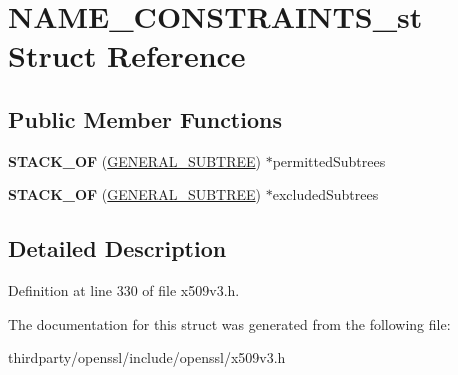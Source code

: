 \hypertarget{struct_n_a_m_e___c_o_n_s_t_r_a_i_n_t_s__st}{}\section{N\+A\+M\+E\+\_\+\+C\+O\+N\+S\+T\+R\+A\+I\+N\+T\+S\+\_\+st Struct Reference}
\label{struct_n_a_m_e___c_o_n_s_t_r_a_i_n_t_s__st}
\subsection*{Public Member Functions}
\begin{DoxyCompactItemize}
\item 
\mbox{\label{struct_n_a_m_e___c_o_n_s_t_r_a_i_n_t_s__st_a018745d61a5d6f8feedf7b6e693cce83}} 
{\bfseries S\+T\+A\+C\+K\+\_\+\+OF} (\hyperlink{struct_g_e_n_e_r_a_l___s_u_b_t_r_e_e__st}{G\+E\+N\+E\+R\+A\+L\+\_\+\+S\+U\+B\+T\+R\+EE}) $\ast$permitted\+Subtrees
\item 
\mbox{\label{struct_n_a_m_e___c_o_n_s_t_r_a_i_n_t_s__st_a92b0238c5c37f7d919e2fb9d23dd44c2}} 
{\bfseries S\+T\+A\+C\+K\+\_\+\+OF} (\hyperlink{struct_g_e_n_e_r_a_l___s_u_b_t_r_e_e__st}{G\+E\+N\+E\+R\+A\+L\+\_\+\+S\+U\+B\+T\+R\+EE}) $\ast$excluded\+Subtrees
\end{DoxyCompactItemize}


\subsection{Detailed Description}


Definition at line 330 of file x509v3.\+h.



The documentation for this struct was generated from the following file\+:\begin{DoxyCompactItemize}
\item 
thirdparty/openssl/include/openssl/x509v3.\+h\end{DoxyCompactItemize}

